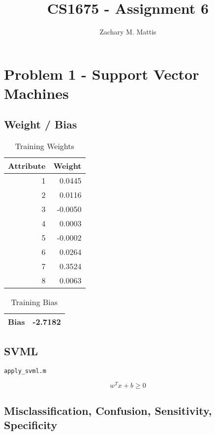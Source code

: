 \documentclass[12pt, letterpaper]{report}
\title{CS1675 - Assignment 6}
\author{Zachary M. Mattis}
\begin{document}
\maketitle

\section{Problem 1 - Support Vector Machines}

\subsection{Weight / Bias}

\begin{table}[H]
	\centering
	\begin{tabular}{ |r|r| }
		\hline
		\textbf{Attribute} & \textbf{Weight} \\
		\hline
		1 & 0.0445 \\
		\hline
		2 & 0.0116 \\
		\hline
		3 & -0.0050 \\
		\hline
		4 & 0.0003 \\
		\hline
		5 & -0.0002 \\
		\hline
		6 & 0.0264 \\
		\hline
		7 & 0.3524 \\
		\hline
		8 & 0.0063 \\
		\hline
	\end{tabular}
	\caption{Training Weights}
\end{table}

\begin{table}[H]
	\centering
	\begin{tabular}{ |r|r| }
		\hline
		\textbf{Bias} & -2.7182 \\
		\hline
	\end{tabular}
	\caption{Training Bias}
\end{table}


\subsection{SVML}

\begin{verbatim}
apply_svml.m
\end{verbatim}

\[ w^{T}x + b \geq 0 \]


\subsection{Misclassification, Confusion, Sensitivity, Specificity}
\end{document}
